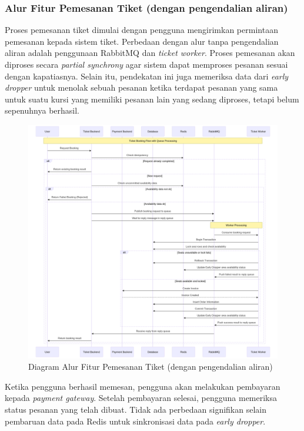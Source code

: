 \pagebreak

\subsubsection{Alur Fitur Pemesanan Tiket (dengan pengendalian aliran)}

Proses pemesanan tiket dimulai dengan pengguna mengirimkan permintaan pemesanan kepada sistem tiket. Perbedaan dengan alur tanpa pengendalian aliran adalah penggunaan RabbitMQ dan \textit{ticket worker}. Proses pemesanan akan diproses secara \textit{partial synchrony} agar sistem dapat memproses pesanan sesuai dengan kapatiasnya. Selain itu, pendekatan ini juga memeriksa data dari \textit{early dropper} untuk menolak sebuah pesanan ketika terdapat pesanan yang sama untuk suatu kursi yang memiliki pesanan lain yang sedang diproses, tetapi belum sepenuhnya berhasil.

\begin{figure}[h]
    \centering
    \includegraphics[width=1\textwidth]{resources/chapter-3/book-async.png}
    \caption{Diagram Alur Fitur Pemesanan Tiket (dengan pengendalian aliran)}
    \label{fig:flow-book-fc}
\end{figure}

\pagebreak

Ketika pengguna berhasil memesan, pengguna akan melakukan pembayaran kepada \textit{payment gateway}. Setelah pembayaran selesai, pengguna memeriksa status pesanan yang telah dibuat. Tidak ada perbedaan signifikan selain pembaruan data pada Redis untuk sinkronisasi data pada \textit{early dropper}.

